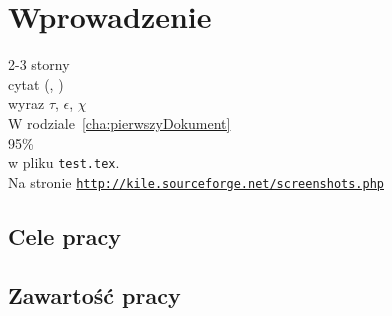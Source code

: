 \chapter{Wprowadzenie}
\label{cha:wprowadzenie}

2-3 storny\\
cytat (\cite{Dil00}, \cite{Lam92})\\
wyraz $\tau$, $\epsilon$, $\chi$\\
W rodziale~\ref{cha:pierwszyDokument}\\
95\%\\
w pliku \texttt{test.tex}.\\
Na stronie \underline{\texttt{http://kile.sourceforge.net/screenshots.php}}\\

\section{Cele pracy}
\label{sec:celePracy}


\section{Zawartość pracy}
\label{sec:zawartoscPracy}




















